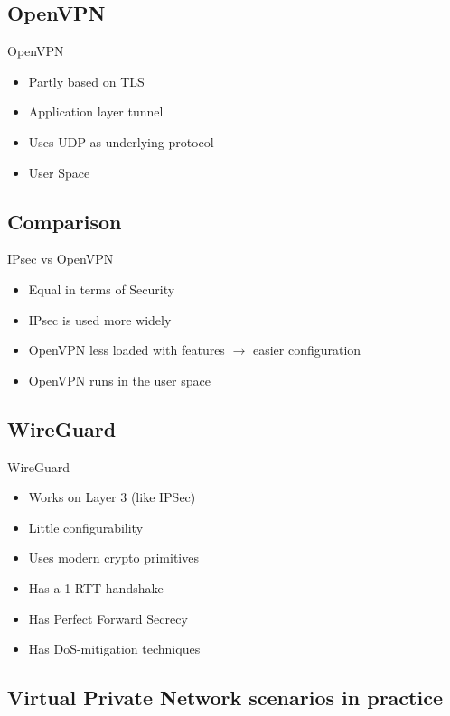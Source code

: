 \subsection{OpenVPN}

\begin{definition}{OpenVPN}\\
    \begin{itemize}
        \item Partly based on TLS
        \item Application layer tunnel
        \item Uses UDP as underlying protocol
        \item User Space
    \end{itemize}
\end{definition}

\subsection{Comparison}

\begin{concept}{IPsec vs OpenVPN}\\
    \begin{itemize}
        \item Equal in terms of Security
        \item IPsec is used more widely
        \item OpenVPN less loaded with features $\rightarrow$ easier configuration
        \item OpenVPN runs in the user space
    \end{itemize}
\end{concept}

\subsection{WireGuard}

\begin{concept}{WireGuard}\\
    \begin{itemize}
        \item Works on Layer 3 (like IPSec)
        \item Little configurability
        \item Uses modern crypto primitives
        \item Has a 1-RTT handshake
        \item Has Perfect Forward Secrecy
        \item Has DoS-mitigation techniques
    \end{itemize}
\end{concept}


\subsection{Virtual Private Network scenarios in practice}

